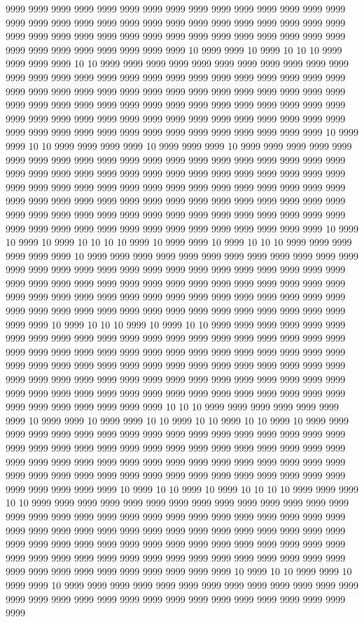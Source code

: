 9999 9999 9999 9999 9999 9999 9999 9999 9999 9999 9999 9999 9999 9999 9999 9999 9999 9999 9999 9999 9999 9999 9999 9999 9999 9999 9999 9999 9999 9999 9999 9999 9999 9999 9999 9999 9999 9999 9999 9999 9999 9999 9999 9999 9999 9999 9999 9999 9999 9999 9999 9999 9999 10 9999 9999 10 9999 10 10 10 9999 9999 9999 9999 10 10 9999 9999 9999 9999 9999 9999 9999 9999 9999 9999 9999 9999 9999 9999 9999 9999 9999 9999 9999 9999 9999 9999 9999 9999 9999 9999 9999 9999 9999 9999 9999 9999 9999 9999 9999 9999 9999 9999 9999 9999 9999 9999 9999 9999 9999 9999 9999 9999 9999 9999 9999 9999 9999 9999 9999 9999 9999 9999 9999 9999 9999 9999 9999 9999 9999 9999 9999 9999 9999 9999 9999 9999 9999 9999 9999 9999 9999 9999 9999 9999 9999 9999 9999 9999 9999 10 9999 9999 10 10 9999 9999 9999 9999 10 9999 9999 9999 10 9999 9999 9999 9999 9999 9999 9999 9999 9999 9999 9999 9999 9999 9999 9999 9999 9999 9999 9999 9999 9999 9999 9999 9999 9999 9999 9999 9999 9999 9999 9999 9999 9999 9999 9999 9999 9999 9999 9999 9999 9999 9999 9999 9999 9999 9999 9999 9999 9999 9999 9999 9999 9999 9999 9999 9999 9999 9999 9999 9999 9999 9999 9999 9999 9999 9999 9999 9999 9999 9999 9999 9999 9999 9999 9999 9999 9999 9999 9999 9999 9999 9999 9999 9999 9999 9999 9999 9999 9999 9999 9999 9999 9999 9999 10 9999 10 9999 10 9999 10 10 10 10 9999 10 9999 9999 10 9999 10 10 10 9999 9999 9999 9999 9999 9999 10 9999 9999 9999 9999 9999 9999 9999 9999 9999 9999 9999 9999 9999 9999 9999 9999 9999 9999 9999 9999 9999 9999 9999 9999 9999 9999 9999 9999 9999 9999 9999 9999 9999 9999 9999 9999 9999 9999 9999 9999 9999 9999 9999 9999 9999 9999 9999 9999 9999 9999 9999 9999 9999 9999 9999 9999 9999 9999 9999 9999 9999 9999 9999 9999 9999 9999 9999 9999 9999 9999 9999 9999 9999 9999 10 9999 10 10 10 9999 10 9999 10 10 9999 9999 9999 9999 9999 9999 9999 9999 9999 9999 9999 9999 9999 9999 9999 9999 9999 9999 9999 9999 9999 9999 9999 9999 9999 9999 9999 9999 9999 9999 9999 9999 9999 9999 9999 9999 9999 9999 9999 9999 9999 9999 9999 9999 9999 9999 9999 9999 9999 9999 9999 9999 9999 9999 9999 9999 9999 9999 9999 9999 9999 9999 9999 9999 9999 9999 9999 9999 9999 9999 9999 9999 9999 9999 9999 9999 9999 9999 9999 9999 9999 9999 9999 9999 9999 9999 9999 9999 10 10 10 9999 9999 9999 9999 9999 9999 9999 10 9999 9999 10 9999 9999 10 10 9999 10 10 9999 10 10 9999 10 9999 9999 9999 9999 9999 9999 9999 9999 9999 9999 9999 9999 9999 9999 9999 9999 9999 9999 9999 9999 9999 9999 9999 9999 9999 9999 9999 9999 9999 9999 9999 9999 9999 9999 9999 9999 9999 9999 9999 9999 9999 9999 9999 9999 9999 9999 9999 9999 9999 9999 9999 9999 9999 9999 9999 9999 9999 9999 9999 9999 9999 9999 9999 9999 9999 9999 9999 10 9999 10 10 9999 10 9999 10 10 10 10 9999 9999 9999 10 10 9999 9999 9999 9999 9999 9999 9999 9999 9999 9999 9999 9999 9999 9999 9999 9999 9999 9999 9999 9999 9999 9999 9999 9999 9999 9999 9999 9999 9999 9999 9999 9999 9999 9999 9999 9999 9999 9999 9999 9999 9999 9999 9999 9999 9999 9999 9999 9999 9999 9999 9999 9999 9999 9999 9999 9999 9999 9999 9999 9999 9999 9999 9999 9999 9999 9999 9999 9999 9999 9999 9999 9999 9999 9999 9999 9999 9999 9999 9999 9999 9999 9999 9999 9999 10 9999 10 10 9999 9999 10 9999 9999 10 9999 9999 9999 9999 9999 9999 9999 9999 9999 9999 9999 9999 9999 9999 9999 9999 9999 9999 9999 9999 9999 9999 9999 9999 9999 9999 9999 9999 9999 